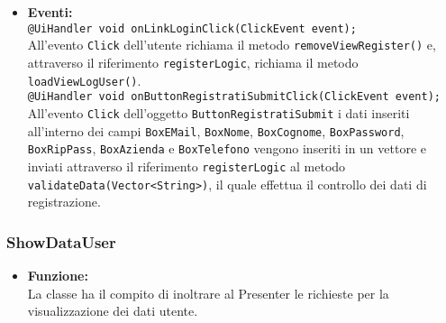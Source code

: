 {\begin{sloppypar}
{{\begin{itemize}
				\texttt{+ void loadViewRegister();}\\
				Visualizza la GUI\g~ di registrazione.\\
				
				\texttt{+ void removeViewRegister();}\\
				Nasconde la GUI\g~ di registrazione.\\
				
				\texttt{+ void errorView(Vector<String> messages);}\\
				Copia le stringhe di errore contenute nel vettore \texttt{messages} nei corrispondenti campi \texttt{LabelError}, che successivamente visualizza.\\
				
			\item[] \textbf{Eventi:}\\
				\texttt{@UiHandler void onLinkLoginClick(ClickEvent event);}\\
				All'evento \texttt{Click} dell'utente richiama il metodo \texttt{removeViewRegister()} e, attraverso il riferimento \texttt{registerLogic}, richiama il metodo \texttt{loadViewLogUser()}.\\
				
				\texttt{@UiHandler void onButtonRegistratiSubmitClick(ClickEvent event);}\\
				All'evento \texttt{Click} dell'oggetto \texttt{ButtonRegistratiSubmit} i dati inseriti all'interno dei campi \texttt{BoxEMail}, \texttt{BoxNome}, \texttt{BoxCognome}, \texttt{BoxPassword}, \texttt{BoxRipPass}, \texttt{BoxAzienda} e \texttt{BoxTelefono} vengono inseriti in un vettore e inviati attraverso il riferimento \texttt{registerLogic} al metodo \texttt{validateData(Vector<String>)}, il quale effettua il controllo dei dati di registrazione.\\
		\end{itemize}
		}

		\subsubsection{ShowDataUser}\label{ssub:ShowDataUser}{
		\begin{itemize}
			\item[] \textbf{Funzione:}\\
				  La classe ha il compito di inoltrare al Presenter le richieste per la visualizzazione dei dati utente.\\
				

\end{itemize}}}
\end{sloppypar}}
